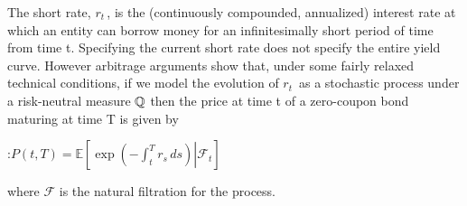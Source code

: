 \begin{dfn}
The short rate, $r_t \,$, is the (continuously compounded, annualized) interest rate at 
which an entity can borrow money for an infinitesimally short period of time from time t. 
Specifying the current short rate does not specify the entire yield curve. However
 arbitrage arguments show that, under some fairly relaxed technical conditions, 
if we model the evolution of $r_t \,$ as a stochastic process under a risk-neutral measure $\mathbb{Q}$ 
then the price at time t of a zero-coupon bond maturing at time T is given by

:$ P(t,T) = \mathbb{E}\left[\left. \exp{\left(-\int_t^T r_s\, ds\right) } \right| \mathcal{F}_t \right] $

where $\mathcal{F}$ is the natural filtration for the process.

\end{dfn}
